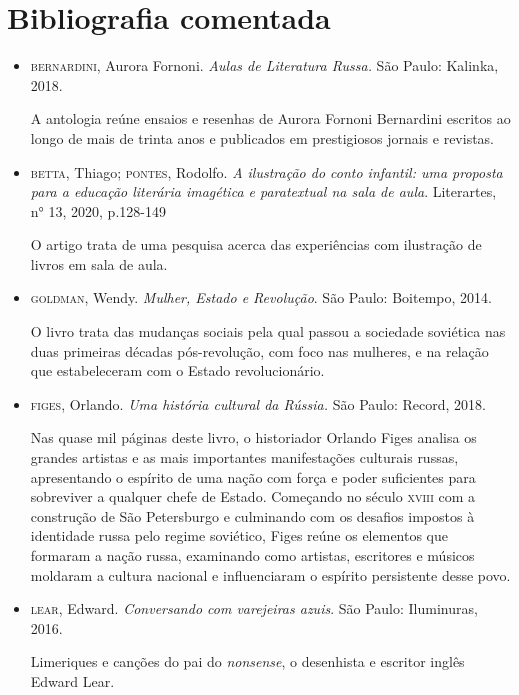 \documentclass[11pt]{extarticle}
\begin{document}
\section{Bibliografia comentada}


\begin{itemize}
\item \textsc{bernardini}, Aurora Fornoni. \emph{Aulas de Literatura Russa.}
São Paulo: Kalinka, 2018.

A antologia reúne ensaios e resenhas de Aurora Fornoni Bernardini escritos ao longo de mais de trinta anos e publicados em prestigiosos jornais e revistas. 

\item\textsc{betta}, Thiago; \textsc{pontes}, Rodolfo. \emph{A ilustração do conto infantil:
uma proposta para a educação literária imagética e paratextual na sala
de aula}. Literartes, n° 13, 2020, p.128-149

O artigo trata de uma pesquisa acerca das experiências com ilustração de livros em sala de aula.

\item\textsc{goldman}, Wendy. \emph{Mulher, Estado e Revolução}. São Paulo: Boitempo,
2014.

O livro trata das mudanças sociais pela qual passou a sociedade soviética nas duas primeiras décadas pós-revolução, com foco nas mulheres, e na relação que estabeleceram com o Estado revolucionário.

\item\textsc{figes}, Orlando. \emph{Uma história cultural da Rússia.} São Paulo:
Record, 2018. 

Nas quase mil páginas deste livro, o historiador
Orlando Figes analisa os grandes artistas e as mais importantes
manifestações culturais russas, apresentando o espírito de uma nação com
força e poder suficientes para sobreviver a qualquer chefe de Estado.
Começando no século \textsc{xviii} com a construção de São Petersburgo e
culminando com os desafios impostos à identidade russa pelo regime
soviético, Figes reúne os elementos que formaram a nação russa,
examinando como artistas, escritores e músicos moldaram a cultura
nacional e influenciaram o espírito persistente desse povo.

\item \textsc{lear}, Edward. \emph{Conversando com varejeiras azuis}. São Paulo: Iluminuras, 2016.

Limeriques e canções do pai do \emph{nonsense}, o desenhista e escritor inglês Edward Lear.


\end{itemize}
\end{document}
